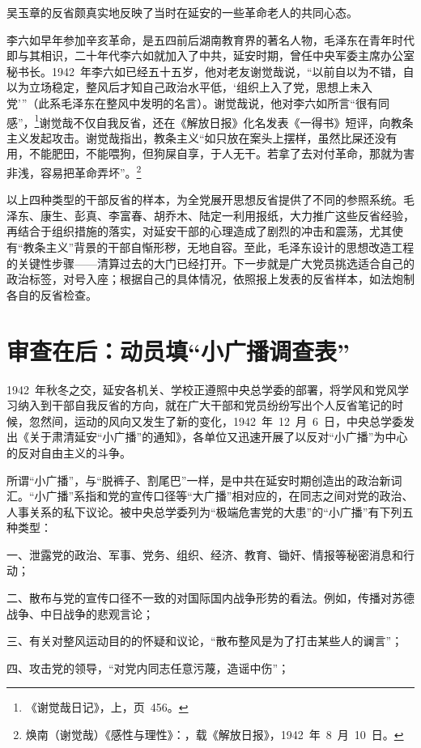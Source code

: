 吴玉章的反省颇真实地反映了当时在延安的一些革命老人的共同心态。

李六如早年参加辛亥革命，是五四前后湖南教育界的著名人物，毛泽东在青年时代即与其相识，二十年代李六如就加入了中共，延安时期，曾任中央军委主席办公室秘书长。1942~年李六如已经五十五岁，他对老友谢觉哉说，“以前自以为不错，自以为立场稳定，整风后才知自己政治水平低，‘组织上入了党，思想上未入党’”（此系毛泽东在整风中发明的名言）。谢觉哉说，他对李六如所言“很有同感”，\footnote{《谢觉哉日记》，上，页~456。}谢觉哉不仅自我反省，还在《解放日报》化名发表《一得书》短评，向教条主义发起攻击。谢觉哉指出，教条主义“如只放在案头上摆样，虽然比屎还没有用，不能肥田，不能喂狗，但狗屎自享，于人无干。若拿了去对付革命，那就为害非浅，容易把革命弄坏”。\footnote{焕南（谢觉哉）《感性与理性》：，载《解放日报》，1942~年~8~月~10~日。}

以上四种类型的干部反省的样本，为全党展开思想反省提供了不同的参照系统。毛泽东、康生、彭真、李富春、胡乔木、陆定一利用报纸，大力推广这些反省经验，再结合于组织措施的落实，对延安干部的心理造成了剧烈的冲击和震荡，尤其使有“教条主义”背景的干部自惭形秽，无地自容。至此，毛泽东设计的思想改造工程的关键性步骤——清算过去的大门已经打开。下一步就是广大党员挑选适合自己的政治标签，对号入座；根据自己的具体情况，依照报上发表的反省样本，如法炮制各自的反省检查。

\section{审查在后：动员填“小广播调查表”}

1942~年秋冬之交，延安各机关、学校正遵照中央总学委的部署，将学风和党风学习纳入到干部自我反省的方向，就在广大干部和党员纷纷写出个人反省笔记的时候，忽然间，运动的风向又发生了新的变化，1942~年~12~月~6~日，中央总学委发出《关于肃清延安“小广播”的通知》，各单位又迅速开展了以反对“小广播”为中心的反对自由主义的斗争。

所谓“小广播”，与“脱裤子、割尾巴”一样，是中共在延安时期创造出的政治新词汇。“小广播”系指和党的宣传口径等“大广播”相对应的，在同志之间对党的政治、人事关系的私下议论。被中央总学委列为“极端危害党的大患”的“小广播”有下列五种类型：

一、泄露党的政治、军事、党务、组织、经济、教育、锄奸、情报等秘密消息和行动；

二、散布与党的宣传口径不一致的对国际国内战争形势的看法。例如，传播对苏德战争、中日战争的悲观言论；

三、有关对整风运动目的的怀疑和议论，“散布整风是为了打击某些人的谰言”；

四、攻击党的领导，“对党内同志任意污蔑，造谣中伤”；

